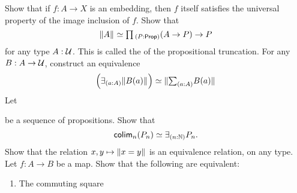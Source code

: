 \begin{exercises}
  \exercise Show that if $f:A\to X$ is an embedding, then $f$ itself satisfies the universal property of the image inclusion of $f$.
  \exercise Show that
  \begin{equation*}
    \eqv{\brck{A}}{\prd{P:\prop}(A\to P)\to P}
  \end{equation*}
  for any type $A:\UU$. This is called the  of the propositional truncation.
  \exercise For any $B:A\to\UU$, construct an equivalence
  \begin{equation*}
    \eqv{\Big(\exists_{(a:A)}\brck{B(a)}\Big)}{\brck{\sm{a:A}B(a)}}
  \end{equation*}
  \exercise Let
  be a sequence of propositions. Show that
  \begin{equation*}
    \eqv{\colim_n(P_n)}{\exists_{(n:\N)} P_n}.
  \end{equation*}
  \exercise Show that the relation $x,y\mapsto\brck{x=y}$ is an equivalence relation, on any type.
  \exercise Let $f:A\to B$ be a map. Show that the following are equivalent:
  \begin{enumerate}
  \item The commuting square
    \begin{equation*}
      \begin{tikzcd}

\end{tikzcd}
\end{equation*}
\end{enumerate}
\end{exercises}
